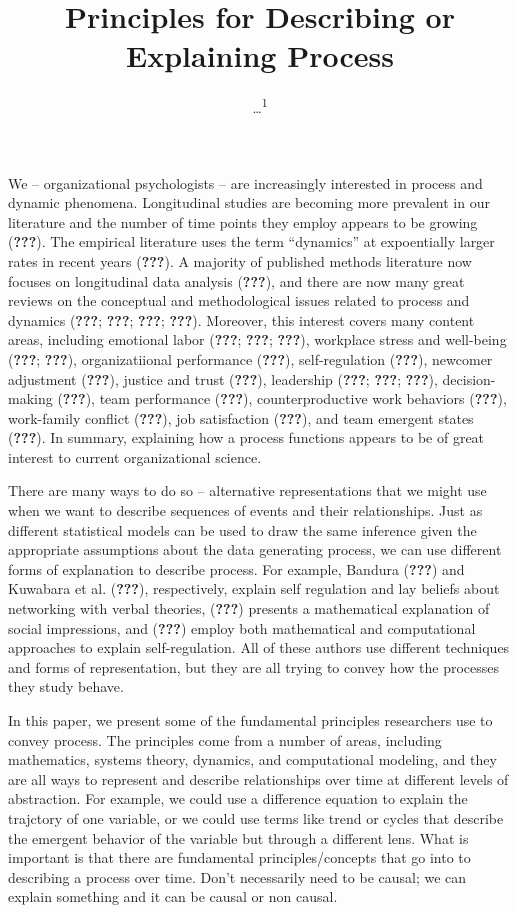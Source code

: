 \documentclass[english,,man]{apa6}
\title{Principles for Describing or Explaining Process}
\author{\ldots{}\textsuperscript{1}}
\date{}
\affiliation{
\vspace{0.5cm}
\textsuperscript{1} ...}
\theoremstyle{definition}
\theoremstyle{definition}
\theoremstyle{definition}
\theoremstyle{remark}
\begin{document}
\maketitle

We -- organizational psychologists -- are increasingly interested in
process and dynamic phenomena. Longitudinal studies are becoming more
prevalent in our literature and the number of time points they employ
appears to be growing ({\textbf{???}}). The empirical literature uses
the term \enquote{dynamics} at expoentially larger rates in recent years
({\textbf{???}}). A majority of published methods literature now focuses
on longitudinal data analysis ({\textbf{???}}), and there are now many
great reviews on the conceptual and methodological issues related to
process and dynamics ({\textbf{???}}; {\textbf{???}}; {\textbf{???}};
{\textbf{???}}). Moreover, this interest covers many content areas,
including emotional labor ({\textbf{???}}; {\textbf{???}};
{\textbf{???}}), workplace stress and well-being ({\textbf{???}};
{\textbf{???}}), organizatiional performance ({\textbf{???}}),
self-regulation ({\textbf{???}}), newcomer adjustment ({\textbf{???}}),
justice and trust ({\textbf{???}}), leadership ({\textbf{???}};
{\textbf{???}}; {\textbf{???}}), decision-making ({\textbf{???}}), team
performance ({\textbf{???}}), counterproductive work behaviors
({\textbf{???}}), work-family conflict ({\textbf{???}}), job
satisfaction ({\textbf{???}}), and team emergent states
({\textbf{???}}). In summary, explaining how a process functions appears
to be of great interest to current organizational science.

There are many ways to do so -- alternative representations that we
might use when we want to describe sequences of events and their
relationships. Just as different statistical models can be used to draw
the same inference given the appropriate assumptions about the data
generating process, we can use different forms of explanation to
describe process. For example, Bandura ({\textbf{???}}) and Kuwabara et
al. ({\textbf{???}}), respectively, explain self regulation and lay
beliefs about networking with verbal theories, ({\textbf{???}}) presents
a mathematical explanation of social impressions, and ({\textbf{???}})
employ both mathematical and computational approaches to explain
self-regulation. All of these authors use different techniques and forms
of representation, but they are all trying to convey how the processes
they study behave.

In this paper, we present some of the fundamental principles researchers
use to convey process. The principles come from a number of areas,
including mathematics, systems theory, dynamics, and computational
modeling, and they are all ways to represent and describe relationships
over time at different levels of abstraction. For example, we could use
a difference equation to explain the trajctory of one variable, or we
could use terms like trend or cycles that describe the emergent behavior
of the variable but through a different lens. What is important is that
there are fundamental principles/concepts that go into to describing a
process over time. Don't necessarily need to be causal; we can explain
something and it can be causal or non causal.
\end{document}

